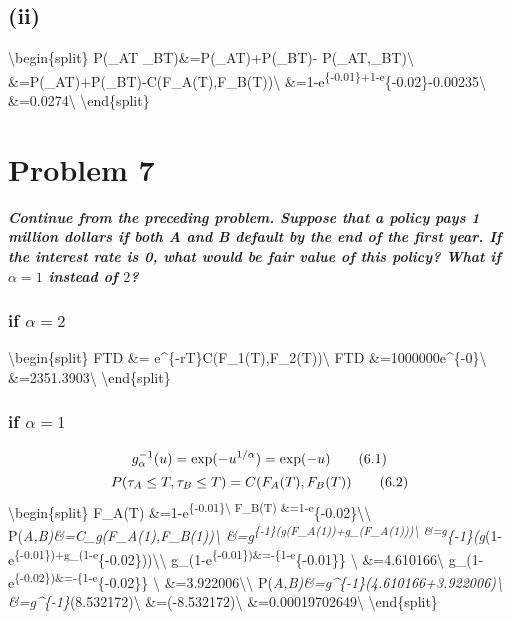 \documentclass[11pt]{article}
\begin{document}
    \hypertarget{ii}{%
\subsection{(ii)}\label{ii}}

\textbackslash{}begin\{split\} P(\tau\_A\leq T 
\tau\_B\leq T)\&=P(\tau\_A\leq T)+P(\tau\_B\leq T)-
P(\tau\_A\leq T,\tau\_B\leq T)\textbackslash{}
\&=P(\tau\_A\leq T)+P(\tau\_B\leq T)-C(F\_A(T),F\_B(T))\textbackslash{}
\&=1-e\textsuperscript{\{-0.01\}+1-e}\{-0.02\}-0.00235\textbackslash{}
\&=0.0274\textbackslash{} \textbackslash{}end\{split\}

    \hypertarget{problem-7}{%
\section{Problem 7}\label{problem-7}}

    \textbf{\emph{Continue from the preceding problem. Suppose that a policy
pays 1 million dollars if both A and B default by the end of the first
year. If the interest rate is 0, what would be fair value of this
policy? What if \(\alpha = 1\) instead of \(2\)?}}

    \hypertarget{if-alpha2}{%
\subsubsection{\texorpdfstring{if
\(\alpha=2\)}{if \textbackslash{}alpha=2}}\label{if-alpha2}}

\textbackslash{}begin\{split\} FTD \&=
e\^{}\{-rT\}C(F\_1(T),F\_2(T))\textbackslash{} FTD
\&=1000000\times e\^{}\{-0\}\textbackslash{}
\&=2351.3903\textbackslash{} \textbackslash{}end\{split\}

    \hypertarget{if-alpha1}{%
\subsubsection{\texorpdfstring{if
\(\alpha=1\)}{if \textbackslash{}alpha=1}}\label{if-alpha1}}

\[g^{-1}_\alpha(u)=\exp(-u^{1/\alpha})=\exp(-u)\\
\tag{6.1}\] \[
P(\tau_A\leq T,\tau_B\leq T)
=C(F_A(T),F_B(T))\\
\tag{6.2}\] \textbackslash{}begin\{split\} F\_A(T)
\&=1-e\textsuperscript{\{-0.01\}\textbackslash{} F\_B(T)
\&=1-e}\{-0.02\}\textbackslash{}\textbackslash{}
P(\tau\emph{A,\tau\emph{B)\&=C\_g(F\_A(1),F\_B(1))\textbackslash{}
\&=g\textsuperscript{\{-1\}\emph{\alpha(g}\alpha(F\_A(1))+g\_\alpha(F\_A(1)))\textbackslash{}
\&=g}\{-1\}}\alpha(g}\alpha(1-e\textsuperscript{\{-0.01\})+g\_\alpha(1-e}\{-0.02\}))\textbackslash{}\textbackslash{}
g\_\alpha(1-e\textsuperscript{\{-0.01\})\&=-\log \{1-e}\{-0.01\}\}
\textbackslash{} \&=4.610166\textbackslash{}
g\_\alpha(1-e\textsuperscript{\{-0.02\})\&=-\log \{1-e}\{-0.02\}\}
\textbackslash{} \&=3.922006\textbackslash{}\textbackslash{}
P(\tau\emph{A,\tau\emph{B)\&=g\^{}\{-1\}}\alpha(4.610166+3.922006)\textbackslash{}
\&=g\^{}\{-1\}}\alpha(8.532172)\textbackslash{}
\&=\exp(-8.532172)\textbackslash{} \&=0.00019702649\textbackslash{}
\textbackslash{}end\{split\}
\end{document}
